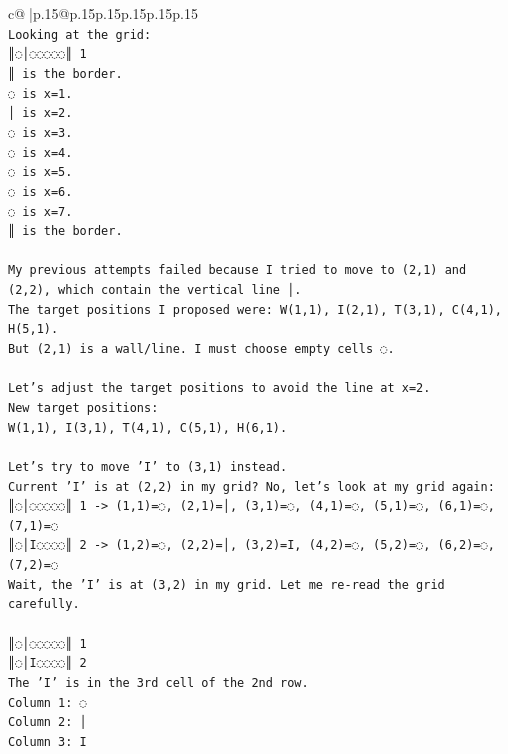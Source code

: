 \documentclass{article}
\begin{document}
{\begin{supertabular}{c@{$\;$}|p{.15\linewidth}@{}p{.15\linewidth}p{.15\linewidth}p{.15\linewidth}p{.15\linewidth}p{.15\linewidth}}
{{{\\ 
\texttt{Looking at the grid:} \\
\texttt{║◌│◌◌◌◌◌║ 1} \\
\texttt{║ is the border.} \\
\texttt{◌ is x=1.} \\
\texttt{│ is x=2.} \\
\texttt{◌ is x=3.} \\
\texttt{◌ is x=4.} \\
\texttt{◌ is x=5.} \\
\texttt{◌ is x=6.} \\
\texttt{◌ is x=7.} \\
\texttt{║ is the border.} \\
\\ 
\texttt{My previous attempts failed because I tried to move to (2,1) and (2,2), which contain the vertical line │.} \\
\texttt{The target positions I proposed were: W(1,1), I(2,1), T(3,1), C(4,1), H(5,1).} \\
\texttt{But (2,1) is a wall/line. I must choose empty cells ◌.} \\
\\ 
\texttt{Let's adjust the target positions to avoid the line at x=2.} \\
\texttt{New target positions:} \\
\texttt{W(1,1), I(3,1), T(4,1), C(5,1), H(6,1).} \\
\\ 
\texttt{Let's try to move 'I' to (3,1) instead.} \\
\texttt{Current 'I' is at (2,2) in my grid? No, let's look at my grid again:} \\
\texttt{║◌│◌◌◌◌◌║ 1 {-}> (1,1)=◌, (2,1)=│, (3,1)=◌, (4,1)=◌, (5,1)=◌, (6,1)=◌, (7,1)=◌} \\
\texttt{║◌│I◌◌◌◌║ 2 {-}> (1,2)=◌, (2,2)=│, (3,2)=I, (4,2)=◌, (5,2)=◌, (6,2)=◌, (7,2)=◌} \\
\texttt{Wait, the 'I' is at (3,2) in my grid. Let me re{-}read the grid carefully.} \\
\\ 
\texttt{║◌│◌◌◌◌◌║ 1} \\
\texttt{║◌│I◌◌◌◌║ 2} \\
\texttt{The 'I' is in the 3rd cell of the 2nd row.} \\
\texttt{Column 1: ◌} \\
\texttt{Column 2: │} \\
\texttt{Column 3: I} \\
}}}
\end{supertabular}}
\end{document}
